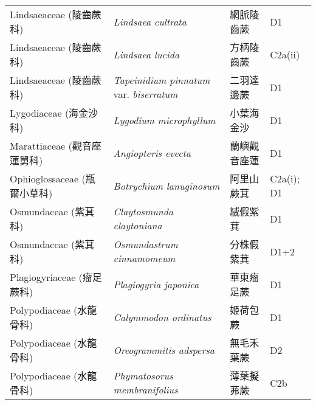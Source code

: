 \begin{longtable}{p{3cm}p{5cm}p{3cm}p{4cm}}
    Lindsaeaceae (陵齒蕨科) & \textit{Lindsaea cultrata}  & 網脈陵齒蕨 & D1 \index{Lindsaea@\textit{Lindsaea}!cultrata@\textit{cultrata}}  \index{網脈陵齒蕨} \\
    Lindsaeaceae (陵齒蕨科) & \textit{Lindsaea lucida}  & 方柄陵齒蕨 & C2a(ii) \index{Lindsaea@\textit{Lindsaea}!lucida@\textit{lucida}}  \index{方柄陵齒蕨} \\
    Lindsaeaceae (陵齒蕨科) & \textit{Tapeinidium pinnatum} var. \textit{biserratum}  & 二羽達邊蕨 & D1 \index{Tapeinidium@\textit{Tapeinidium}!pinnatum@\textit{pinnatum}!var. biserratum@var. \textit{biserratum}}  \index{二羽達邊蕨} \\
    Lygodiaceae (海金沙科) & \textit{Lygodium microphyllum}  & 小葉海金沙 & D1 \index{Lygodium@\textit{Lygodium}!microphyllum@\textit{microphyllum}}  \index{小葉海金沙} \\
    Marattiaceae (觀音座蓮舅科) & \textit{Angiopteris evecta}  & 蘭嶼觀音座蓮 & D1 \index{Angiopteris@\textit{Angiopteris}!evecta@\textit{evecta}}  \index{蘭嶼觀音座蓮} \\
    Ophioglossaceae (瓶爾小草科) & \textit{Botrychium lanuginosum}  & 阿里山蕨萁 & C2a(i); D1 \index{Botrychium@\textit{Botrychium}!lanuginosum@\textit{lanuginosum}}  \index{阿里山蕨萁} \\
    Osmundaceae (紫萁科) & \textit{Claytosmunda claytoniana}  & 絨假紫萁 & D1 \index{Claytosmunda@\textit{Claytosmunda}!claytoniana@\textit{claytoniana}}  \index{絨假紫萁} \\
    Osmundaceae (紫萁科) & \textit{Osmundastrum cinnamomeum}  & 分株假紫萁 & D1+2 \index{Osmundastrum@\textit{Osmundastrum}!cinnamomeum@\textit{cinnamomeum}}  \index{分株假紫萁} \\
    Plagiogyriaceae (瘤足蕨科) & \textit{Plagiogyria japonica}  & 華東瘤足蕨 & D1 \index{Plagiogyria@\textit{Plagiogyria}!japonica@\textit{japonica}}  \index{華東瘤足蕨} \\
    Polypodiaceae (水龍骨科) & \textit{Calymmodon ordinatus}  & 姬荷包蕨 & D1 \index{Calymmodon@\textit{Calymmodon}!ordinatus@\textit{ordinatus}}  \index{姬荷包蕨} \\
    Polypodiaceae (水龍骨科) & \textit{Oreogrammitis adspersa}  & 無毛禾葉蕨 & D2 \index{Oreogrammitis@\textit{Oreogrammitis}!adspersa@\textit{adspersa}}  \index{無毛禾葉蕨} \\
    Polypodiaceae (水龍骨科) & \textit{Phymatosorus membranifolius}  & 薄葉擬茀蕨 & C2b \index{Phymatosorus@\textit{Phymatosorus}!membranifolius@\textit{membranifolius}}  \index{薄葉擬茀蕨} \\

\end{longtable}
